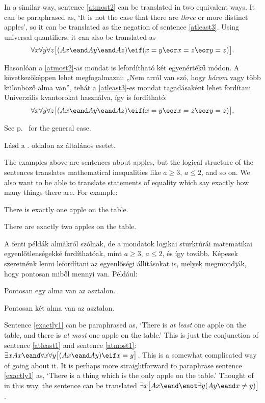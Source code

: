 In a similar way, sentence \ref{atmost2} can be translated in two equivalent ways. It can be paraphrased as, `It is not the case that there are \emph{three} or more distinct apples', so it can be translated as the negation of sentence \ref{atleast3}. Using universal quantifiers, it can also be translated as
$$\forall x\forall y\forall z\bigl[(Ax \eand Ay \eand Az) \eif (x=y \eor x=z \eor y=z)\bigr].$$

Hasonlóan a \ref{atmost2}-as mondat is lefordítható két egyenértékű módon. A következőképpen lehet megfogalmazni: „Nem arról van szó, hogy \emph{három} vagy több különböző alma van”, tehát a \ref{atleast3}-es mondat tagadásaként lehet fordítani. Univerzális kvantorokat használva, így is fordítható:
$$\forall x\forall y\forall z\bigl[(Ax \eand Ay \eand Az) \eif (x=y \eor x=z \eor y=z)\bigr].$$

See p.~\pageref{summary.atmost} for the general case.

Lásd a \pageref{summary.atmost}. oldalon az általános esetet.

The examples above are sentences about apples, but the logical structure of the sentences translates mathematical inequalities like $a\geq 3$, $a \leq 2$, and so on. We also want to be able to translate statements of equality which say exactly how many things there are. For example:
\begin{earg}
\item[\ex{exactly1}] There is exactly one apple on the table.
\item[\ex{exactly2}] There are exactly two apples on the table.
\end{earg}

A fenti példák almákról szólnak, de a mondatok logikai sturktúrái matematikai egyenlőtlenségekké fordíthatóak, mint $a\geqslant 3$, $a \leqslant 2$, és így tovább. Képesek szeretnénk lenni lefordítani az egyenlőségi állításokat is, melyek megmondják, hogy pontosan miből mennyi van. Például:
\begin{earg}
\item[\ex{exactly1}] Pontosan egy alma van az asztalon.
\item[\ex{exactly2}] Pontosan két alma van az asztalon.
\end{earg}

Sentence \ref{exactly1} can be paraphrased as, `There is \emph{at least} one apple on the table, and there is \emph{at most} one apple on the table.' This is just the conjunction of sentence \ref{atleast1} and sentence \ref{atmost1}: $\exists x Ax \eand \forall x\forall y\bigl[(Ax \eand Ay) \eif x=y\bigr]$. This is a somewhat complicated way of going about it. It is perhaps more straightforward to paraphrase sentence \ref{exactly1} as, `There is a thing which is the only apple on the table.' Thought of in this way, the sentence can be translated $\exists x\bigl[Ax \eand \enot\exists y(Ay \eand x\neq y)\bigr]$.

